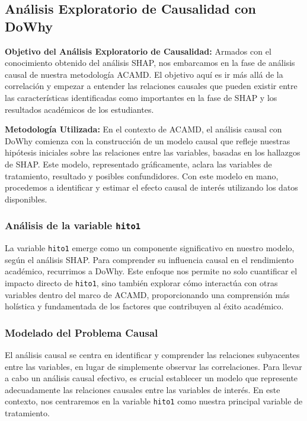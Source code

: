 \subsection{Análisis Exploratorio de Causalidad con DoWhy}
\textbf{Objetivo del Análisis Exploratorio de Causalidad:} Armados con el conocimiento obtenido del análisis SHAP, nos embarcamos en la fase de análisis causal de nuestra metodología ACAMD. El objetivo aquí es ir más allá de la correlación y empezar a entender las relaciones causales que pueden existir entre las características identificadas como importantes en la fase de SHAP y los resultados académicos de los estudiantes.

\textbf{Metodología Utilizada:} En el contexto de ACAMD, el análisis causal con DoWhy comienza con la construcción de un modelo causal que refleje nuestras hipótesis iniciales sobre las relaciones entre las variables, basadas en los hallazgos de SHAP. Este modelo, representado gráficamente, aclara las variables de tratamiento, resultado y posibles confundidores. Con este modelo en mano, procedemos a identificar y estimar el efecto causal de interés utilizando los datos disponibles.

\subsubsection{Análisis de la variable \texttt{hito1}}
La variable \texttt{hito1} emerge como un componente significativo en nuestro modelo, según el análisis SHAP. Para comprender su influencia causal en el rendimiento académico, recurrimos a DoWhy. Este enfoque nos permite no solo cuantificar el impacto directo de \texttt{hito1}, sino también explorar cómo interactúa con otras variables dentro del marco de ACAMD, proporcionando una comprensión más holística y fundamentada de los factores que contribuyen al éxito académico.

\subsubsection{Modelado del Problema Causal}

El análisis causal se centra en identificar y comprender las relaciones subyacentes entre las variables, en lugar de simplemente observar las correlaciones. Para llevar a cabo un análisis causal efectivo, es crucial establecer un modelo que represente adecuadamente las relaciones causales entre las variables de interés. En este contexto, nos centraremos en la variable \texttt{hito1} como nuestra principal variable de tratamiento.

